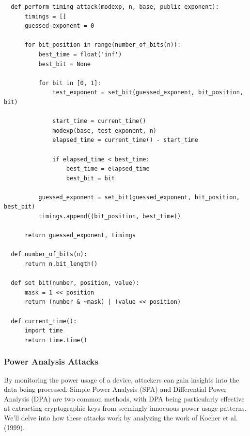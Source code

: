\begin{verbatim}
  def perform_timing_attack(modexp, n, base, public_exponent):
      timings = []
      guessed_exponent = 0
  
      for bit_position in range(number_of_bits(n)):
          best_time = float('inf')
          best_bit = None
  
          for bit in [0, 1]:
              test_exponent = set_bit(guessed_exponent, bit_position, bit)
  
              start_time = current_time()
              modexp(base, test_exponent, n)
              elapsed_time = current_time() - start_time

              if elapsed_time < best_time:
                  best_time = elapsed_time
                  best_bit = bit
  
          guessed_exponent = set_bit(guessed_exponent, bit_position, best_bit)
          timings.append((bit_position, best_time))
  
      return guessed_exponent, timings
  
  def number_of_bits(n):
      return n.bit_length()
  
  def set_bit(number, position, value):
      mask = 1 << position
      return (number & ~mask) | (value << position)
  
  def current_time():
      import time
      return time.time()
\end{verbatim}

\subsubsection{Power Analysis Attacks}

By monitoring the power usage of a device, attackers can gain insights into the data being processed. Simple Power Analysis (SPA) and Differential Power Analysis (DPA) are two common methods, with DPA being particularly effective at extracting cryptographic keys from seemingly innocuous power usage patterns.
We'll delve into how these attacks work by analyzing the work of Kocher et al. (1999)\cite{kocherDifferentialPowerAnalysis1999}.

